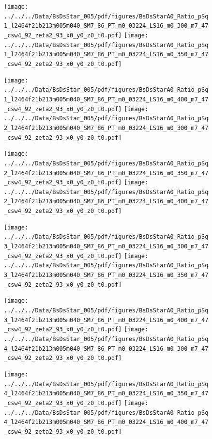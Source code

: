 \documentclass[a4paper,10pt]{article}
\begin{document}
\begin{figure}[p]
 \texttt{[image: ../../../Data/BsDsStar\_005/pdf/figures/BsDsStarA0\_Ratio\_pSq1\_l2464f21b213m005m040\_SM7\_86\_PT\_m0\_03224\_LS16\_m0\_300\_m7\_47\_csw4\_92\_zeta2\_93\_x0\_y0\_z0\_t0.pdf]} 
 \texttt{[image: ../../../Data/BsDsStar\_005/pdf/figures/BsDsStarA0\_Ratio\_pSq1\_l2464f21b213m005m040\_SM7\_86\_PT\_m0\_03224\_LS16\_m0\_350\_m7\_47\_csw4\_92\_zeta2\_93\_x0\_y0\_z0\_t0.pdf]} 
 \end{figure}
\begin{figure}[p]
 \texttt{[image: ../../../Data/BsDsStar\_005/pdf/figures/BsDsStarA0\_Ratio\_pSq1\_l2464f21b213m005m040\_SM7\_86\_PT\_m0\_03224\_LS16\_m0\_400\_m7\_47\_csw4\_92\_zeta2\_93\_x0\_y0\_z0\_t0.pdf]} 
 \texttt{[image: ../../../Data/BsDsStar\_005/pdf/figures/BsDsStarA0\_Ratio\_pSq2\_l2464f21b213m005m040\_SM7\_86\_PT\_m0\_03224\_LS16\_m0\_300\_m7\_47\_csw4\_92\_zeta2\_93\_x0\_y0\_z0\_t0.pdf]} 
 \end{figure}
\begin{figure}[p]
 \texttt{[image: ../../../Data/BsDsStar\_005/pdf/figures/BsDsStarA0\_Ratio\_pSq2\_l2464f21b213m005m040\_SM7\_86\_PT\_m0\_03224\_LS16\_m0\_350\_m7\_47\_csw4\_92\_zeta2\_93\_x0\_y0\_z0\_t0.pdf]} 
 \texttt{[image: ../../../Data/BsDsStar\_005/pdf/figures/BsDsStarA0\_Ratio\_pSq2\_l2464f21b213m005m040\_SM7\_86\_PT\_m0\_03224\_LS16\_m0\_400\_m7\_47\_csw4\_92\_zeta2\_93\_x0\_y0\_z0\_t0.pdf]} 
 \end{figure}
\clearpage
\begin{figure}[p]
 \texttt{[image: ../../../Data/BsDsStar\_005/pdf/figures/BsDsStarA0\_Ratio\_pSq3\_l2464f21b213m005m040\_SM7\_86\_PT\_m0\_03224\_LS16\_m0\_300\_m7\_47\_csw4\_92\_zeta2\_93\_x0\_y0\_z0\_t0.pdf]} 
 \texttt{[image: ../../../Data/BsDsStar\_005/pdf/figures/BsDsStarA0\_Ratio\_pSq3\_l2464f21b213m005m040\_SM7\_86\_PT\_m0\_03224\_LS16\_m0\_350\_m7\_47\_csw4\_92\_zeta2\_93\_x0\_y0\_z0\_t0.pdf]} 
 \end{figure}
\begin{figure}[p]
 \texttt{[image: ../../../Data/BsDsStar\_005/pdf/figures/BsDsStarA0\_Ratio\_pSq3\_l2464f21b213m005m040\_SM7\_86\_PT\_m0\_03224\_LS16\_m0\_400\_m7\_47\_csw4\_92\_zeta2\_93\_x0\_y0\_z0\_t0.pdf]} 
 \texttt{[image: ../../../Data/BsDsStar\_005/pdf/figures/BsDsStarA0\_Ratio\_pSq4\_l2464f21b213m005m040\_SM7\_86\_PT\_m0\_03224\_LS16\_m0\_300\_m7\_47\_csw4\_92\_zeta2\_93\_x0\_y0\_z0\_t0.pdf]} 
 \end{figure}
\begin{figure}[p]
 \texttt{[image: ../../../Data/BsDsStar\_005/pdf/figures/BsDsStarA0\_Ratio\_pSq4\_l2464f21b213m005m040\_SM7\_86\_PT\_m0\_03224\_LS16\_m0\_350\_m7\_47\_csw4\_92\_zeta2\_93\_x0\_y0\_z0\_t0.pdf]} 
 \texttt{[image: ../../../Data/BsDsStar\_005/pdf/figures/BsDsStarA0\_Ratio\_pSq4\_l2464f21b213m005m040\_SM7\_86\_PT\_m0\_03224\_LS16\_m0\_400\_m7\_47\_csw4\_92\_zeta2\_93\_x0\_y0\_z0\_t0.pdf]} 
 \end{figure}
\end{document}
